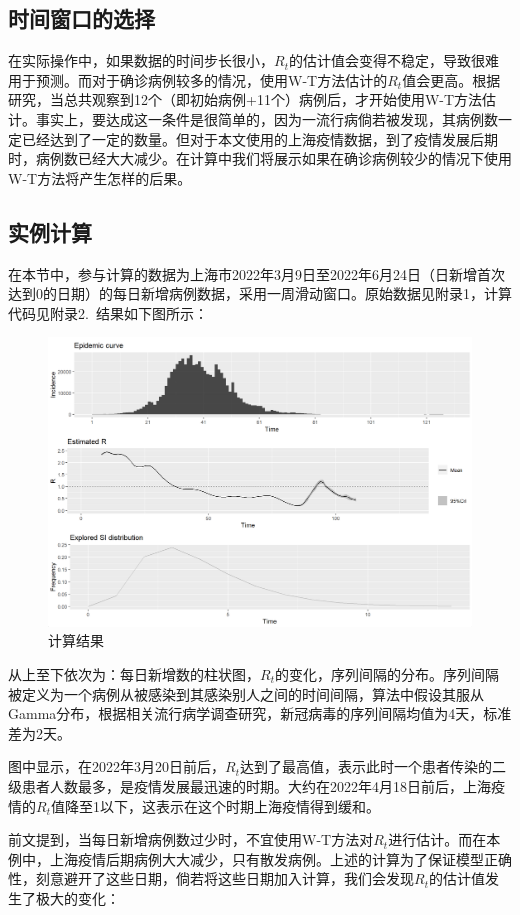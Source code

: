 \documentclass[a4paper,12pt,onecolumn,twoside]{article}
\begin{document}
\subsection{时间窗口的选择}
在实际操作中，如果数据的时间步长很小，$R_{t}$的估计值会变得不稳定，导致很难用于预测。而对于确诊病例较多的情况，使用W-T方法估计的$R_{t}$值会更高。根据研究，当总共观察到12个（即初始病例+11个）病例后，才开始使用W-T方法估计。事实上，要达成这一条件是很简单的，因为一流行病倘若被发现，其病例数一定已经达到了一定的数量。但对于本文使用的上海疫情数据，到了疫情发展后期时，病例数已经大大减少。在计算中我们将展示如果在确诊病例较少的情况下使用W-T方法将产生怎样的后果。
\subsection{实例计算}
在本节中，参与计算的数据为上海市2022年3月9日至2022年6月24日（日新增首次达到0的日期）的每日新增病例数据，采用一周滑动窗口。原始数据见附录1，计算代码见附录2.~结果如下图所示：
\begin{figure}[H]
	\centering
	\includegraphics[width=\linewidth]{res/shanghai.png}
	\caption{计算结果}
\end{figure}
从上至下依次为：每日新增数的柱状图，$R_{t}$的变化，序列间隔的分布。序列间隔被定义为一个病例从被感染到其感染别人之间的时间间隔，算法中假设其服从Gamma分布，根据相关流行病学调查研究，新冠病毒的序列间隔均值为4天，标准差为2天。\par 
图中显示，在2022年3月20日前后，$R_{t}$达到了最高值，表示此时一个患者传染的二级患者人数最多，是疫情发展最迅速的时期。大约在2022年4月18日前后，上海疫情的$R_{t}$值降至1以下，这表示在这个时期上海疫情得到缓和。\par 
前文提到，当每日新增病例数过少时，不宜使用W-T方法对$R_{t}$进行估计。而在本例中，上海疫情后期病例大大减少，只有散发病例。上述的计算为了保证模型正确性，刻意避开了这些日期，倘若将这些日期加入计算，我们会发现$R_{t}$的估计值发生了极大的变化：
\end{document}
